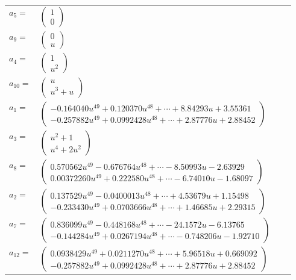 \documentclass[1p]{elsarticle_modified}
\theoremstyle{definition}
\begin{document}
\begin{tabular}{m{7pt} m{180pt} m{7pt} m{180pt} }
\flushright $a_{5}=$&$\begin{pmatrix}1\\0\end{pmatrix}$ \\
\flushright $a_{9}=$&$\begin{pmatrix}0\\u\end{pmatrix}$ \\
\flushright $a_{4}=$&$\begin{pmatrix}1\\u^2\end{pmatrix}$ \\
\flushright $a_{10}=$&$\begin{pmatrix}u\\u^3+u\end{pmatrix}$ \\
\flushright $a_{1}=$&$\begin{pmatrix}-0.164040 u^{49}+0.120370 u^{48}+\cdots+8.84293 u+3.55361\\-0.257882 u^{49}+0.0992428 u^{48}+\cdots+2.87776 u+2.88452\end{pmatrix}$ \\
\flushright $a_{3}=$&$\begin{pmatrix}u^2+1\\u^4+2 u^2\end{pmatrix}$ \\
\flushright $a_{8}=$&$\begin{pmatrix}0.570562 u^{49}-0.676764 u^{48}+\cdots-8.50993 u-2.63929\\0.00372260 u^{49}+0.222580 u^{48}+\cdots-6.74010 u-1.68097\end{pmatrix}$ \\
\flushright $a_{2}=$&$\begin{pmatrix}0.137529 u^{49}-0.0400013 u^{48}+\cdots+4.53679 u+1.15498\\-0.233430 u^{49}+0.0703666 u^{48}+\cdots+1.46685 u+2.29315\end{pmatrix}$ \\
\flushright $a_{7}=$&$\begin{pmatrix}0.836099 u^{49}-0.448168 u^{48}+\cdots-24.1572 u-6.13765\\-0.144284 u^{49}+0.0267194 u^{48}+\cdots-0.748206 u-1.92710\end{pmatrix}$ \\
\flushright $a_{12}=$&$\begin{pmatrix}0.0938429 u^{49}+0.0211270 u^{48}+\cdots+5.96518 u+0.669092\\-0.257882 u^{49}+0.0992428 u^{48}+\cdots+2.87776 u+2.88452\end{pmatrix}$ \\

\end{tabular}
\end{document}
